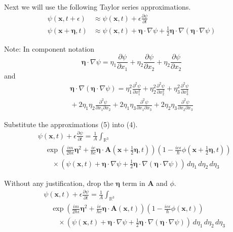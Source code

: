 \documentclass[12pt]{article}
\newcommand\INT{\int_{\mathbb R^3}}
\begin{document}
Next we will use the following Taylor series approximations.
\begin{equation*}
\begin{aligned}
\psi(\mathbf x,t+\epsilon)&\approx\psi(\mathbf x,t)+\epsilon\frac{\partial\psi}{\partial t}
\\
\psi(\mathbf x+\boldsymbol\eta,t)&\approx\psi(\mathbf x,t)+\boldsymbol\eta\cdot\nabla\psi
+\tfrac{1}{2}\boldsymbol\eta\cdot\nabla(\boldsymbol\eta\cdot\nabla\psi)
\end{aligned}
\tag{5}
\end{equation*}

Note: In component notation
\begin{equation*}
\boldsymbol\eta\cdot\nabla\psi=
\eta_1\frac{\partial\psi}{\partial x_1}+
\eta_2\frac{\partial\psi}{\partial x_2}+
\eta_2\frac{\partial\psi}{\partial x_2}
\end{equation*}
and
\begin{multline*}
\boldsymbol\eta\cdot\nabla(\boldsymbol\eta\cdot\nabla\psi)=
\eta_1^2\frac{\partial^2\psi}{\partial x_1^2}
+\eta_2^2\frac{\partial^2\psi}{\partial x_2^2}
+\eta_3^2\frac{\partial^2\psi}{\partial x_3^2}
\\
{}+2\eta_1\eta_2\frac{\partial^2\psi}{\partial x_1\partial x_2}
+2\eta_1\eta_3\frac{\partial^2\psi}{\partial x_1\partial x_3}
+2\eta_2\eta_3\frac{\partial^2\psi}{\partial x_2\partial x_3}
\end{multline*}

Substitute the approximations (5) into (4).
\begin{align*}
&\psi(\mathbf x,t)+\epsilon\frac{\partial\psi}{\partial t}=
\frac{1}{A}\INT
\\
&\quad{}\exp
\left(
\frac{im}{2\hbar\epsilon}\boldsymbol\eta^2
+\frac{ie}{\hbar c}\boldsymbol\eta\cdot\mathbf A\left(\mathbf x+\tfrac{1}{2}\boldsymbol\eta,t\right)
\right)
\left(1-\frac{ie\epsilon}{\hbar}\phi\left(\mathbf x+\tfrac{1}{2}\boldsymbol\eta,t\right)\right)
\\
&\quad\quad{}\times
\left(
\psi(\mathbf x,t)+\boldsymbol\eta\cdot\nabla\psi
+\tfrac{1}{2}\boldsymbol\eta\cdot\nabla(\boldsymbol\eta\cdot\nabla\psi)
\right)
\,d\eta_1\,d\eta_2\,d\eta_3
\end{align*}

Without any justification, drop the $\boldsymbol\eta$ term in $\mathbf A$ and $\phi$.
\begin{align*}
&\psi(\mathbf x,t)+\epsilon\frac{\partial\psi}{\partial t}=
\frac{1}{A}\INT
\\
&\quad{}\exp
\left(
\frac{im}{2\hbar\epsilon}\boldsymbol\eta^2
+\frac{ie}{\hbar c}\boldsymbol\eta\cdot\mathbf A\left(\mathbf x,t\right)
\right)
\left(1-\frac{ie\epsilon}{\hbar}\phi\left(\mathbf x,t\right)\right)
\\
&\quad\quad{}\times
\left(
\psi(\mathbf x,t)+\boldsymbol\eta\cdot\nabla\psi
+\tfrac{1}{2}\boldsymbol\eta\cdot\nabla(\boldsymbol\eta\cdot\nabla\psi)
\right)
\,d\eta_1\,d\eta_2\,d\eta_3
\tag{6}
\end{align*}
\end{document}
